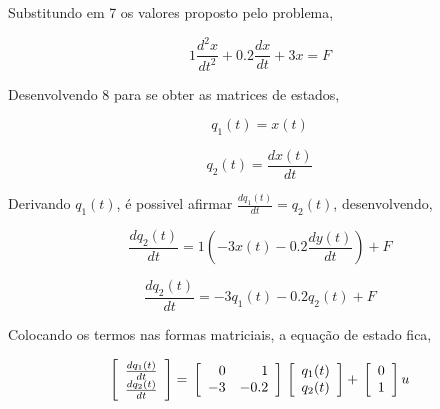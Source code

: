 \documentclass[a4paper, 10pt]{article}
\begin{document}
\begin{list}{\textbf{Questão .}}{
\setlength{\labelwidth}{-2mm} \setlength{\parsep}{0mm}
\setlength{\topsep}{0mm} \setlength{\leftmargin}{0mm}}
        Substitundo em 7 os valores proposto pelo problema,

        \begin{equation}
            1 \frac{d^2 x}{d t^2} +  0.2 \frac{d x}{d t} + 3 x = F
        \end{equation}
        
        Desenvolvendo 8 para se obter as matrices de estados,
        
        \begin{equation}
        	q_1(t) = x(t)
        \end{equation}
        
        \begin{equation}
        	q_2(t) = \frac{d x(t)}{d t}
        \end{equation}
        
        Derivando $q_1(t)$, é possivel afirmar $\frac{d q_1(t)}{d t} = q_2(t)$, desenvolvendo,
        
        \begin{equation}
        	\frac{d q_2(t)}{d t} = 1 \left(-3 x(t) - 0.2 \frac{d y(t)}{d t} \right) + F
        \end{equation}
        
        \begin{equation}
        	\frac{d q_2(t)}{d t} = -3 q_1(t) - 0.2 q_2(t) + F
        \end{equation}
        
        Colocando os termos nas formas matriciais, a equação de estado fica,
        
        
        \begin{equation}
          \left[\begin{array}{c}
          \frac{d q_1(t)}{d t} \\
          \frac{d q_2(t)}{d t}
          \end{array}\right] = \\
          \left[\begin{array}{rr}
          0 & 1 \\
          -3 & -0.2
          \end{array}\right]  \\
          \left[\begin{array}{c}
          q_1(t) \\
          q_2(t)
          \end{array}\right] + \\
          \left[\begin{array}{r}
          0 \\
          1
          \end{array}\right] u
        \end{equation}



\end{list}
\end{document}
